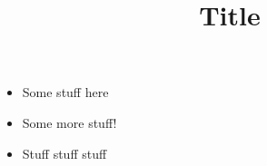 \documentclass{article}
\title{Title}
\date{}
\begin{document}
	\maketitle
	 
		\begin{itemize}
			\item Some stuff here
			\item Some more stuff!
			\item Stuff stuff stuff
		\end{itemize}
\end{document}
